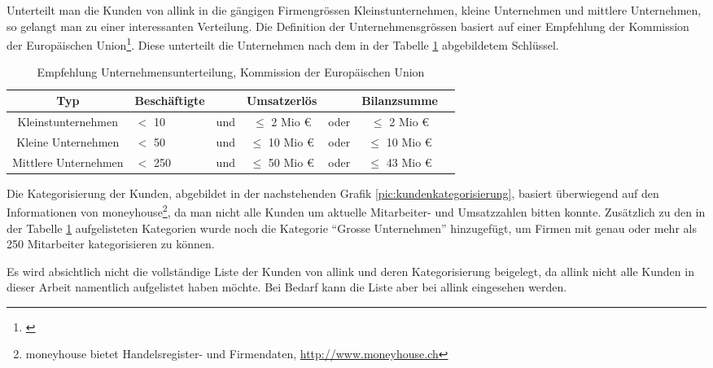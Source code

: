 Unterteilt man die Kunden von allink in die gängigen Firmengrössen Kleinstunternehmen,
kleine Unternehmen und mittlere Unternehmen, so gelangt man zu einer interessanten 
Verteilung. Die Definition der Unternehmensgrössen basiert auf einer Empfehlung
der Kommission der Europäischen Union\footnote{\citealp*[Vgl.][Anhang Art. 2]{eu_komission_unternehmen}}.
Diese unterteilt die Unternehmen nach dem in der Tabelle \ref{tab:eu_unterteilung} 
abgebildetem Schlüssel.

\begin{table}[h]
\begin{center}
    \begin{tabular}{clccccc}
        \toprule \textbf{Typ} & \textbf{Beschäftigte} & & \textbf{Umsatzerlös} & & \textbf{Bilanzsumme} \\
        \midrule Kleinstunternehmen & $<$ 10 & und & $\leq$ 2 Mio \euro & oder & $\leq$ 2 Mio \euro \\
        \midrule Kleine Unternehmen & $<$ 50 & und & $\leq$ 10 Mio \euro & oder & $\leq$ 10 Mio \euro \\
        \midrule Mittlere Unternehmen & $<$ 250 & und & $\leq$ 50 Mio \euro & oder & $\leq$ 43 Mio \euro \\
        \bottomrule
    \end{tabular}
    \caption{Empfehlung Unternehmensunterteilung, Kommission der Europäischen Union}
    \label{tab:eu_unterteilung}
\end{center}
\end{table}

Die Kategorisierung der Kunden, abgebildet in der nachstehenden Grafik \ref{pic:kundenkategorisierung},
basiert überwiegend auf den Informationen von moneyhouse\footnote{moneyhouse bietet Handelsregister- und Firmendaten, \url{http://www.moneyhouse.ch}}, 
da man nicht alle Kunden um aktuelle Mitarbeiter- und Umsatzzahlen bitten konnte.
Zusätzlich zu den in der Tabelle \ref{tab:eu_unterteilung} aufgelisteten Kategorien 
wurde noch die Kategorie ``Grosse Unternehmen'' hinzugefügt, um Firmen mit genau 
oder mehr als 250 Mitarbeiter kategorisieren zu können.

Es wird absichtlich nicht die vollständige Liste der Kunden von allink und deren 
Kategorisierung beigelegt, da allink nicht alle Kunden in dieser Arbeit namentlich 
aufgelistet haben möchte. Bei Bedarf kann die Liste aber bei allink eingesehen werden.


